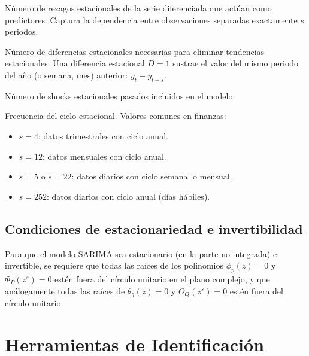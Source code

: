 \documentclass[12pt,a4paper]{article}
\begin{document}
\begin{description}[leftmargin=3em,style=nextline]
  \item[$P$ --- Orden autorregresivo estacional]
    Número de rezagos estacionales de la serie diferenciada que actúan como predictores.
    Captura la dependencia entre observaciones separadas exactamente $s$ periodos.

  \item[$D$ --- Orden de integración estacional]
    Número de diferencias estacionales necesarias para eliminar tendencias estacionales.
    Una diferencia estacional $D=1$ sustrae el valor del mismo periodo del año (o semana, mes)
    anterior: $y_t - y_{t-s}$.

  \item[$Q$ --- Orden de media móvil estacional]
    Número de shocks estacionales pasados incluidos en el modelo.

  \item[$s$ --- Periodo estacional]
    Frecuencia del ciclo estacional. Valores comunes en finanzas:
    \begin{itemize}
      \item $s = 4$: datos trimestrales con ciclo anual.
      \item $s = 12$: datos mensuales con ciclo anual.
      \item $s = 5$ o $s=22$: datos diarios con ciclo semanal o mensual.
      \item $s = 252$: datos diarios con ciclo anual (días hábiles).
    \end{itemize}
\end{description}

\subsection{Condiciones de estacionariedad e invertibilidad}

Para que el modelo SARIMA sea estacionario (en la parte no integrada) e invertible, se
requiere que todas las raíces de los polinomios $\phi_p(z) = 0$ y $\Phi_P(z^s) = 0$ estén
fuera del círculo unitario en el plano complejo, y que análogamente todas las raíces de
$\theta_q(z) = 0$ y $\Theta_Q(z^s) = 0$ estén fuera del círculo unitario.

\section{Herramientas de Identificación}
\end{document}
